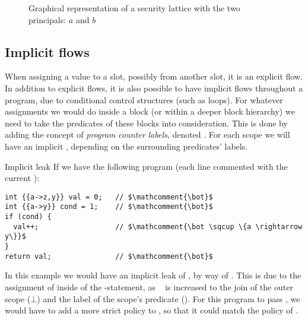 \begin{figure}\label{dlm:fig:lattice}
  \centering
  
  \caption{Graphical representation of a security lattice with the two principals: $a$ and $b$}
\end{figure}

\subsection{Implicit flows}
When assigning a value to a slot, possibly from another slot, it is an explicit flow.
In addition to explicit flows, it is also possible to have implicit flows throughout a program, due to conditional control structures (such as loops).
For whatever assignments we would do inside a block (or within a deeper block hierarchy) we need to take the predicates of these blocks into consideration.
This is done by adding the concept of \emph{program counter labels}, denoted \dlmpc.
For each scope we will have an implicit \dlmpc, depending on the surrounding predicates' labels.

\begin{example}{Implicit leak}\label{dlm:ex:implicit_leak}
  If we have the following program (each line commented with the current \dlmpc):
  \begin{lstlisting}[style=dlmc]
int {{a->z,y}} val = 0;   // $\mathcomment{\bot}$
int {{a->y}} cond = 1;    // $\mathcomment{\bot}$
if (cond) {
  val++;                  // $\mathcomment{\bot \sqcup \{a \rightarrow y\}}$
}
return val;               // $\mathcomment{\bot}$
  \end{lstlisting}
  In this example we would have an implicit leak of , by way of .
  This is due to the assignment of  inside of the -statement, as \dlmpc~ is increased to the join of the outer scope ($\bot$) and the label of the scope's predicate ().
  For this program to pass \thetool, we would have to add a more strict policy to , so that it could match the policy of .
\end{example}

